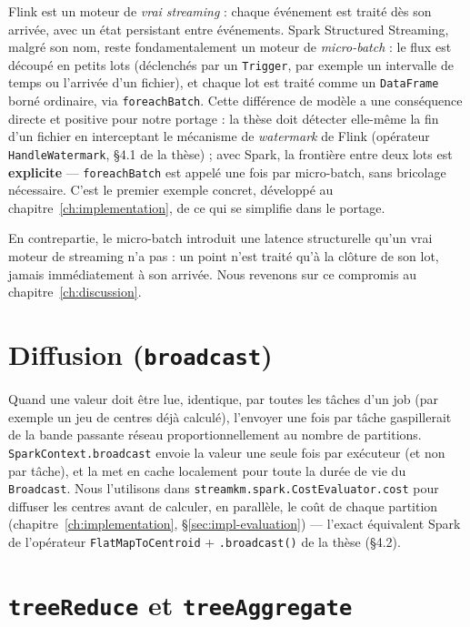 Flink est un moteur de \emph{vrai streaming} : chaque événement est traité
dès son arrivée, avec un état persistant entre événements. Spark Structured
Streaming, malgré son nom, reste fondamentalement un moteur de
\emph{micro-batch} : le flux est découpé en petits lots (déclenchés par un
\texttt{Trigger}, par exemple un intervalle de temps ou l'arrivée d'un
fichier), et chaque lot est traité comme un \texttt{DataFrame} borné
ordinaire, via \texttt{foreachBatch}. Cette différence de modèle a une
conséquence directe et positive pour notre portage : la thèse doit détecter
elle-même la fin d'un fichier en interceptant le mécanisme de
\emph{watermark} de Flink (opérateur \texttt{HandleWatermark}, §4.1 de la
thèse) ; avec Spark, la frontière entre deux lots est \textbf{explicite} ---
\texttt{foreachBatch} est appelé une fois par micro-batch, sans bricolage
nécessaire. C'est le premier exemple concret, développé au
chapitre~\ref{ch:implementation}, de ce qui se simplifie dans le portage.

En contrepartie, le micro-batch introduit une latence structurelle
qu'un vrai moteur de streaming n'a pas : un point n'est traité qu'à la
clôture de son lot, jamais immédiatement à son arrivée. Nous revenons sur
ce compromis au chapitre~\ref{ch:discussion}.

\section{Diffusion (\texttt{broadcast})}

Quand une valeur doit être lue, identique, par toutes les tâches d'un job
(par exemple un jeu de centres déjà calculé), l'envoyer une fois par tâche
gaspillerait de la bande passante réseau proportionnellement au nombre de
partitions. \texttt{SparkContext.broadcast} envoie la valeur une seule fois
par exécuteur (et non par tâche), et la met en cache localement pour toute
la durée de vie du \texttt{Broadcast}. Nous l'utilisons dans
\texttt{streamkm.spark.CostEvaluator.cost} pour diffuser les centres avant
de calculer, en parallèle, le coût de chaque partition
(chapitre~\ref{ch:implementation}, §\ref{sec:impl-evaluation}) --- l'exact
équivalent Spark de l'opérateur \texttt{FlatMapToCentroid} + \texttt{.broadcast()}
de la thèse (§4.2).

\section{\texttt{treeReduce} et \texttt{treeAggregate}}
\label{sec:spark-treereduce}

